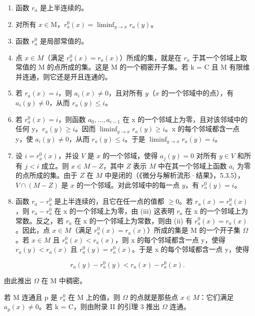 \begin{enumerate}
\def\labelenumi{(\roman{enumi})}
\item
  函数 \(r_a\) 是上半连续的。
\item
  对所有 \(x \in \mathrm{M}\)，\(r_a^0(x) = \liminf_{y \to x} r_a(y)\)。
\item
  函数 \(r_a^0\) 是局部常值的。
\item
  点 \(x \in M\)（满足 \(r_{a}^{0}(x) = r_{a}(x)\)）所成的集，就是在 \(r_{a}\) 于其一个邻域上取常值的 M 的点所成的集。这是 M 的一个稠密开子集。若 k = C 且 M 有限维并连通，则它还是开且连通的。
\item
  若 \(r_a(x) = i\)，则 \(a_i(x) \neq 0\)，且对所有 \(y\)（\(x\) 的一个邻域中的点），有 \(a_i(y) \neq 0\)，从而 \(r_a(y) \leq i\)。
\item
  若 \(r_{a}^{0}(x) = i\)，则函数 \(a_{0}, \ldots, a_{i-1}\) 在 x 的一个邻域上为零，且对该邻域中的任何 y，\(r_{a}(y) \geq i\)。因而 \(\liminf_{y \to x} r_{a}(y) \geq i\)。x 的每个邻域都含一点 y，使 \(a_{i}(y) \neq 0\)，从而 \(r_{a}(y) \leq i\)。于是 \(\liminf_{y \to x} r_{a}(y) = i\)。
\item
  设 \(i = r_a^0 (x)\)，并设 \(V\) 是 \(x\) 的一个邻域，使得 \(a_{j}(y) = 0\) 对所有 \(y\in V\) 和所有 \(j < i\) 成立。则 \(x\in M - Z\)，其中 \(Z\) 表示 \(M\) 中在其一个邻域上函数 \(a_{i}\) 为零的点所成的集。由于 \(Z\) 在 \(M\) 中是闭的（《微分与解析流形·结果》，5.3.5），\(V\cap (M - Z)\) 是 \(x\) 的一个邻域。对此邻域中的每一点 \(y\)，有 \(r_a^0 (y) = i\)。
\item
  函数 \(r_{a}-r_{a}^{0}\) 是上半连续的，且它在任一点的值都 \(\geq0\)。若 \(r_{a}(x)=r_{a}^{0}(x)\)，则 \(r_{a}-r_{a}^{0}\) 在 x 的一个邻域上为零，由 (iii) 这表明 \(r_{a}\) 在 x 的一个邻域上为常数。反之，若 \(r_{a}\) 在 x 的一个邻域上为常数，则由 (ii) 有 \(r_{a}^{0}(x)=r_{a}(x)\)。因此，点 \(x\in M\)（满足 \(r_{a}^{0}(x)=r_{a}(x)\)）所成的集是 M 的一个开子集 \(\Omega\)。若 \(x\in M\) 且 \(r_{a}^{0}(x)<r_{a}(x)\)，则 x 的每个邻域都含一点 y，使得 \(r_{a}(y)<r_{a}(x)\) 且 \(r_{a}^{0}(y)=r_{a}^{0}(x)\)。于是 x 的每个邻域都含一点 y，使得
\end{enumerate}

\[
r _ {a} (y) - r _ {a} ^ {0} (y) <   r _ {a} (x) - r _ {a} ^ {0} (x).
\]

由此推出 \(\Omega\) 在 M 中稠密。

若 M 连通且 p 是 \(r_{a}^{0}\) 在 M 上的值，则 \(\Omega\) 的点就是那些点 \(x \in M\)：它们满足 \(a_{p}(x) \neq 0\)。若 k = C，则由附录 II 的引理 3 推出 \(\Omega\) 连通。

